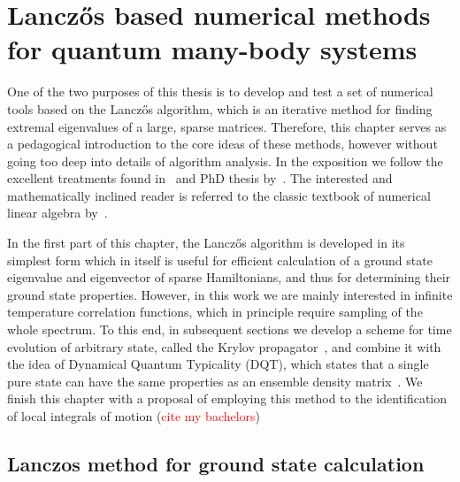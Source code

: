 \chapter{Lancz\H{o}s based numerical methods for quantum many-body systems}
\thispagestyle{chapterBeginStyle}

One of the two purposes of this thesis is to develop and test a set of numerical tools based on the Lancz\H{o}s algorithm,
which is an iterative method for finding extremal eigenvalues of a large, sparse matrices. Therefore, this chapter serves as a
pedagogical introduction to the core ideas of these methods, however without going too deep into details of algorithm analysis.
In the exposition we follow the excellent treatments found in~\textcite{Sandvik2010} and PhD thesis by~\textcite{Crivelli2016}.
The interested and mathematically inclined reader is referred to the classic textbook of numerical linear algebra by~\textcite{Trefethen1997}.

In the first part of this chapter, the Lancz\H{o}s algorithm is developed in its simplest form which in itself is useful for efficient calculation
of a ground state eigenvalue and eigenvector of sparse Hamiltonians, and thus for determining their ground state properties.
However, in this work we are mainly interested in infinite temperature correlation functions, which in principle require sampling of the whole spectrum.
To this end, in subsequent sections we develop a scheme for time evolution of arbitrary state, called the Krylov propagator~\autocite{Park1986},
 and combine it with the idea of Dynamical Quantum Typicality (DQT), which states that a single pure state can have the same
 properties as an ensemble density matrix~\autocite{Gemmer2003,Goldstein2006,Popescu2006}.
We finish this chapter with a proposal of employing this method to the identification of local integrals of motion (\textcolor{red}{cite my bachelors})

\section{Lanczos method for ground state calculation}
